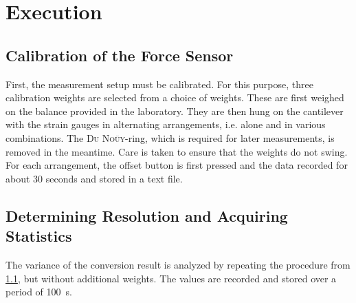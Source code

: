 \chapter{Execution}
    \section{Calibration of the Force Sensor} \label{sec:Calibration}
        First, the measurement setup must be calibrated. For this purpose, three calibration weights are selected from a choice
        of weights. These are first weighed on the balance provided in the laboratory. They are then hung on the cantilever with
        the strain gauges in alternating arrangements, i.e. alone and in various combinations. The \textsc{Du Noüy}-ring, which
        is required for later measurements, is removed in the meantime. Care is taken to ensure that the weights do not swing.
        For each arrangement, the offset button is first pressed and the data recorded for about \(30\) seconds and stored in a text
        file.
    \section{Determining Resolution and Acquiring Statistics} \label{sec:Statistics}
        The variance of the conversion result is analyzed by repeating the procedure from \cref{sec:Calibration}, but without
        additional weights. The values are recorded and stored over a period of \SI{100}{s}.
